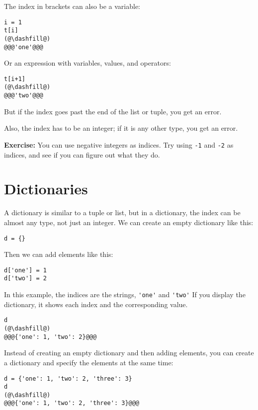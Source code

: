 The index in brackets can also be a variable:

\begin{lstlisting}[]
i = 1
t[i]
(@\dashfill@)
@@@'one'@@@
\end{lstlisting}

Or an expression with variables, values, and operators:

\begin{lstlisting}[]
t[i+1]
(@\dashfill@)
@@@'two'@@@
\end{lstlisting}

But if the index goes past the end of the list or tuple, you get an
error.

Also, the index has to be an integer; if it is any other type, you get
an error.

\textbf{Exercise:} You can use negative integers as indices. Try using
\passthrough{\lstinline!-1!} and \passthrough{\lstinline!-2!} as
indices, and see if you can figure out what they do.

\hypertarget{dictionaries-1}{%
\section{Dictionaries}\label{dictionaries-1}}

A dictionary is similar to a tuple or list, but in a dictionary, the
index can be almost any type, not just an integer. We can create an
empty dictionary like this:

\begin{lstlisting}[]
d = {}
\end{lstlisting}

Then we can add elements like this:

\begin{lstlisting}[]
d['one'] = 1
d['two'] = 2
\end{lstlisting}

In this example, the indices are the strings,
\passthrough{\lstinline!'one'!} and \passthrough{\lstinline!'two'!} If
you display the dictionary, it shows each index and the corresponding
value.

\begin{lstlisting}[]
d
(@\dashfill@)
@@@{'one': 1, 'two': 2}@@@
\end{lstlisting}

Instead of creating an empty dictionary and then adding elements, you
can create a dictionary and specify the elements at the same time:

\begin{lstlisting}[]
d = {'one': 1, 'two': 2, 'three': 3}
d
(@\dashfill@)
@@@{'one': 1, 'two': 2, 'three': 3}@@@
\end{lstlisting}

